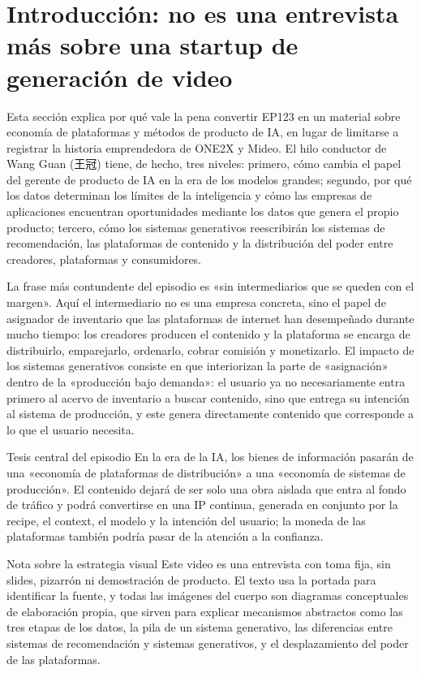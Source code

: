 \section{Introducción: no es una entrevista más sobre una startup de generación de video}

Esta sección explica por qué vale la pena convertir EP123 en un material sobre economía de plataformas y métodos de producto de IA, en lugar de limitarse a registrar la historia emprendedora de ONE2X y Mideo. El hilo conductor de Wang Guan (王冠) tiene, de hecho, tres niveles: primero, cómo cambia el papel del gerente de producto de IA en la era de los modelos grandes; segundo, por qué los datos determinan los límites de la inteligencia y cómo las empresas de aplicaciones encuentran oportunidades mediante los datos que genera el propio producto; tercero, cómo los sistemas generativos reescribirán los sistemas de recomendación, las plataformas de contenido y la distribución del poder entre creadores, plataformas y consumidores.

La frase más contundente del episodio es «sin intermediarios que se queden con el margen». Aquí el intermediario no es una empresa concreta, sino el papel de asignador de inventario que las plataformas de internet han desempeñado durante mucho tiempo: los creadores producen el contenido y la plataforma se encarga de distribuirlo, emparejarlo, ordenarlo, cobrar comisión y monetizarlo. El impacto de los sistemas generativos consiste en que interiorizan la parte de «asignación» dentro de la «producción bajo demanda»: el usuario ya no necesariamente entra primero al acervo de inventario a buscar contenido, sino que entrega su intención al sistema de producción, y este genera directamente contenido que corresponde a lo que el usuario necesita.

\begin{importantbox}{Tesis central del episodio}
En la era de la IA, los bienes de información pasarán de una «economía de plataformas de distribución» a una «economía de sistemas de producción». El contenido dejará de ser solo una obra aislada que entra al fondo de tráfico y podrá convertirse en una IP continua, generada en conjunto por la recipe, el context, el modelo y la intención del usuario; la moneda de las plataformas también podría pasar de la atención a la confianza.
\end{importantbox}

\begin{knowledgebox}{Nota sobre la estrategia visual}
Este video es una entrevista con toma fija, sin slides, pizarrón ni demostración de producto. El texto usa la portada para identificar la fuente, y todas las imágenes del cuerpo son diagramas conceptuales de elaboración propia, que sirven para explicar mecanismos abstractos como las tres etapas de los datos, la pila de un sistema generativo, las diferencias entre sistemas de recomendación y sistemas generativos, y el desplazamiento del poder de las plataformas.
\end{knowledgebox}

